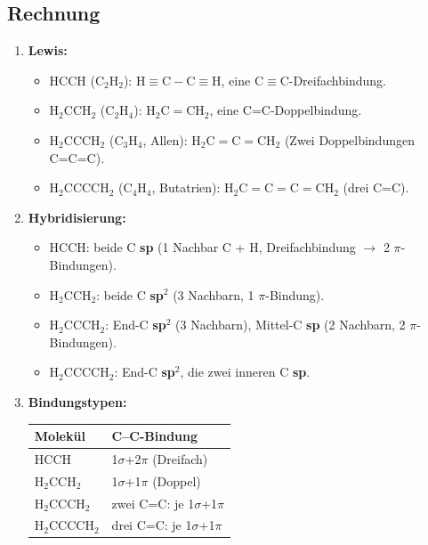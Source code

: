 \subsection*{Rechnung}
\begin{enumerate}
  \item[a)] \textbf{Lewis:}
  \begin{itemize}
    \item $\mathrm{HCCH}$ ($\mathrm{C_2H_2}$): $\mathrm{H\equiv C \mathbin{-} C\equiv H}$,
          eine C$\equiv$C-Dreifachbindung.
    \item $\mathrm{H_2CCH_2}$ ($\mathrm{C_2H_4}$): $\mathrm{H_2C=C H_2}$,
          eine C=C-Doppelbindung.
    \item $\mathrm{H_2CCCH_2}$ ($\mathrm{C_3H_4}$, Allen):
          $\mathrm{H_2C=C=C H_2}$ (Zwei Doppelbindungen C=C=C).
    \item $\mathrm{H_2CCCCH_2}$ ($\mathrm{C_4H_4}$, Butatrien):
          $\mathrm{H_2C=C=C=CH_2}$ (drei C=C).
  \end{itemize}
  \item[b)] \textbf{Hybridisierung:}
  \begin{itemize}
    \item $\mathrm{HCCH}$: beide C \textbf{sp} (1 Nachbar C + H,
          Dreifachbindung $\rightarrow$ 2 $\pi$-Bindungen).
    \item $\mathrm{H_2CCH_2}$: beide C \textbf{sp$^2$} (3 Nachbarn,
          1 $\pi$-Bindung).
    \item $\mathrm{H_2CCCH_2}$: End-C \textbf{sp$^2$} (3 Nachbarn),
          Mittel-C \textbf{sp} (2 Nachbarn, 2 $\pi$-Bindungen).
    \item $\mathrm{H_2CCCCH_2}$: End-C \textbf{sp$^2$}, die zwei inneren
          C \textbf{sp}.
  \end{itemize}
  \item[c)] \textbf{Bindungstypen:}
  \begin{center}
  \begin{tabular}{ll}
    Molekül & C--C-Bindung \\ \hline
    $\mathrm{HCCH}$      & 1$\sigma$+2$\pi$ (Dreifach) \\
    $\mathrm{H_2CCH_2}$  & 1$\sigma$+1$\pi$ (Doppel) \\
    $\mathrm{H_2CCCH_2}$ & zwei C=C: je 1$\sigma$+1$\pi$ \\
    $\mathrm{H_2CCCCH_2}$& drei C=C: je 1$\sigma$+1$\pi$ \\
  \end{tabular}
  \end{center}

\end{enumerate}
